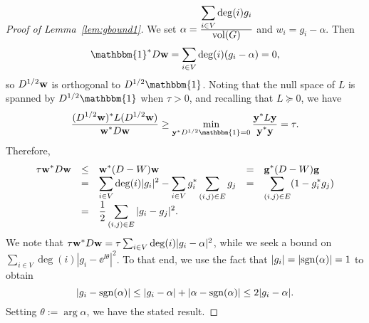 \begin{proof}[Proof of Lemma~\ref{lem:gbound1}]
We set $\alpha = \frac{\displaystyle \sum_{i \in V} \deg(i) g_i}{\displaystyle \mathrm{vol}(G)}$ and $w_i = g_i - \alpha$.  Then \[\mathbbm{1}^* D {\bf w} = \sum_{i \in V} \deg(i)(g_i - \alpha) = 0,\] so $D^{1/2}{\bf w}$ is orthogonal to $ D^{1/2}\mathbbm{1}$.  Noting that the null space of $L$ is spanned by $D^{1/2}\mathbbm{1}$ when $\tau > 0$, and recalling that $L \succeq 0$, we have \[\bigfrac{(D^{1/2}{\bf w})^* L (D^{1/2} {\bf w})}{{\bf w}^* D {\bf w}} \ge \min_{ \y^*D^{1/2}\mathbbm{1}=0} \bigfrac{{\bf y}^* L {\bf y}}{{\bf y}^* {\bf y}} = \tau.\]  Therefore, \[\everymath{\displaystyle} 
\begin{array}{rclcl}%
\tau {\bf w}^* D {\bf w} & \le&  {\bf w}^*(D - W) {\bf w} & = & {\bf g}^*(D - W) {\bf g}  \\
 & = & \sum_{i \in V} \deg(i) |g_i|^2 - \sum_{i \in V} g_i^* \sum_{(i,j) \in E}  g_j & = & \sum_{(i,j) \in E} (1 - g _i^* g_j) \\
 & = & \frac{1}{2} \sum_{(i, j) \in E} |g_i - g_j|^2.%
\end{array}\]%
We note that $\tau {\bf w}^* D {\bf w} = \tau \sum_{i \in V}\deg(i)|g_i - \alpha|^2$, while we seek a bound on $\sum_{i \in V} \deg(i) |g_i - \ee^{\ii \theta}|^2$.  To that end, we use the fact that $|g_i| = |\mathrm{sgn}(\alpha)| = 1$ to obtain $$|g_i - \mathrm{sgn}(\alpha)| \le |g_i - \alpha| + |\alpha - \mathrm{sgn}(\alpha)| \le 2|g_i - \alpha|.$$   Setting $\theta := \arg{\alpha}$, we have the stated result.
\end{proof}

